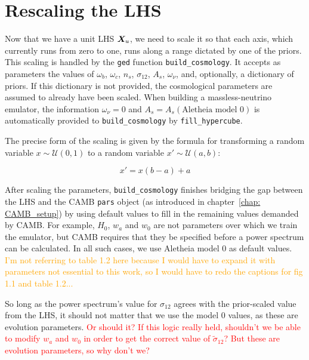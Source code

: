 \section{Rescaling the LHS}
\label{sec: lhc_rescale}


Now that we have a unit LHS $\bm{X}_u$, we need to scale it 
so that each axis, which currently runs from zero to one, runs along a range 
dictated by one of the priors. This scaling is handled by the \texttt{ged}
function \verb|build_cosmology|. It accepts as parameters the values of
$\omega_b$, $\omega_c$, $n_s$, $\sigma_{12}$, $A_s$, $\omega_\nu$, and, 
optionally, a dictionary of priors. If this
dictionary is not provided, the cosmological parameters are assumed to
already have been scaled. When building a massless-neutrino emulator,
the information $\omega_\nu = 0$ and $A_s = A_s(\text{Aletheia model 0})$ is
automatically provided to \verb|build_cosmology| by
\verb|fill_hypercube|. 

The precise form of the scaling is given by the formula for transforming a
random variable $x \sim \mathcal{U}(0, 1)$ to a random variable
$x' \sim \mathcal{U}(a, b)$:

\begin{equation}
\label{eq: scaling}
x' = x (b - a) + a
\end{equation}

After scaling the parameters, \verb|build_cosmology| finishes bridging the gap
between the LHS and the CAMB \verb|pars| object (as introduced in
chapter~\ref{chap: CAMB_setup}) by using default values to fill in the
remaining values demanded by CAMB. For example, $H_0$, $w_a$ and $w_0$ are
not parameters over
which we train the emulator, but CAMB requires that they be specified before
a power spectrum can be calculated. In all such cases, we use Aletheia model
0 as default values. \textcolor{orange}{I'm not referring to table 1.2 here
because I would have to expand it with parameters not essential to this work,
so I would have to redo the captions for fig 1.1 and table 1.2...}

So long as the power spectrum's value for $\sigma_{12}$ agrees with the
prior-scaled value from the LHS, it should not matter that 
we use the model 0 values, as these are evolution parameters.
\textcolor{red}{Or should it? If this logic really held, shouldn't we be able 
to modify $w_a$ and $w_0$ in order to get the correct value of
$\tilde{\sigma}_{12}$? But these are evolution parameters, so why don't we?}

